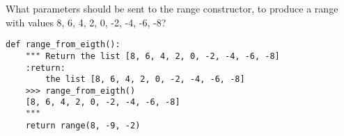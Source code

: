  \label{sssec:ex1_10}

What parameters should be sent to the range constructor, to produce a
range with values 8, 6, 4, 2, 0, -2, -4, -6, -8?

\begin{lstlisting}[title=Exercise R-1.10]
def range_from_eigth():
    """ Return the list [8, 6, 4, 2, 0, -2, -4, -6, -8]
    :return:
        the list [8, 6, 4, 2, 0, -2, -4, -6, -8]
    >>> range_from_eigth()
    [8, 6, 4, 2, 0, -2, -4, -6, -8]
    """
    return range(8, -9, -2)
\end{lstlisting}